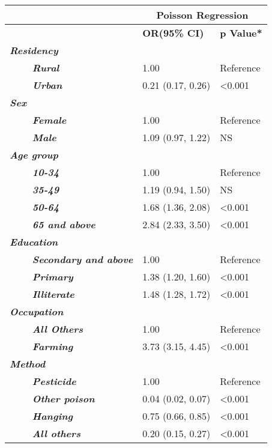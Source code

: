 \begin{table}[!htbp]
\centering
\begin{tabular}[c]{@{}lll@{}}
\toprule
 & \multicolumn{2}{c}{\textbf{Poisson Regression}} \\* \midrule

\textbf{~}  & \textbf{OR(95\% CI)}& \textbf{p Value*} \\ \midrule

\textbf{\textit{Residency}} & ~ & ~   \\
\textbf{\textit{~~~~Rural}} & 1.00 & Reference   \\
\textbf{\textit{~~~~Urban}} & 0.21 (0.17, 0.26) & <0.001  \\

\textbf{\textit{Sex}}  & ~ & ~ \\
\textbf{\textit{~~~~Female}} & 1.00 & Reference   \\
\textbf{\textit{~~~~Male}} & 1.09 (0.97, 1.22) & NS \\  

\textbf{\textit{Age group}} & ~ & ~ \\
\textbf{\textit{~~~~10-34}} & 1.00 & Reference  \\ 
\textbf{\textit{~~~~35-49}} & 1.19 (0.94, 1.50) & NS \\ 
\textbf{\textit{~~~~50-64}} & 1.68 (1.36, 2.08) & <0.001 \\
\textbf{\textit{~~~~65 and above}} &  2.84 (2.33, 3.50) & <0.001 \\

\textbf{\textit{Education}} & ~ & ~ \\
\textbf{\textit{~~~~Secondary and above}} & 1.00 & Reference \\  
\textbf{\textit{~~~~Primary}} & 1.38 (1.20, 1.60) & <0.001 \\ 
\textbf{\textit{~~~~Illiterate}} & 1.48 (1.28, 1.72)& <0.001 \\

\textbf{\textit{Occupation}} & ~ & ~ \\
\textbf{\textit{~~~~All Others}} & 1.00 & Reference \\
\textbf{\textit{~~~~Farming}} & 3.73 (3.15, 4.45) & <0.001 \\

\textbf{\textit{Method}} & ~ & ~  \\
\textbf{\textit{~~~~Pesticide}} & 1.00 & Reference  \\
\textbf{\textit{~~~~Other poison}} & 0.04 (0.02, 0.07) & <0.001 \\
\textbf{\textit{~~~~Hanging}} & 0.75 (0.66, 0.85) & <0.001 \\
\textbf{\textit{~~~~All others}} & 0.20 (0.15, 0.27) & <0.001 \\


\end{tabular}
\end{table}
